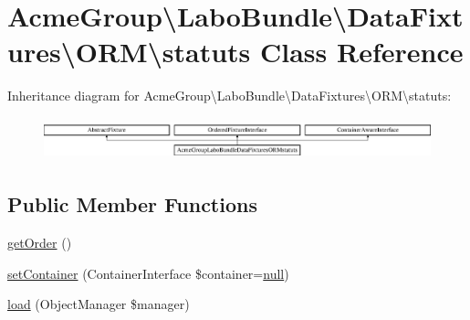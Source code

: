 \hypertarget{class_acme_group_1_1_labo_bundle_1_1_data_fixtures_1_1_o_r_m_1_1statuts}{\section{Acme\+Group\textbackslash{}Labo\+Bundle\textbackslash{}Data\+Fixtures\textbackslash{}O\+R\+M\textbackslash{}statuts Class Reference}
\label{class_acme_group_1_1_labo_bundle_1_1_data_fixtures_1_1_o_r_m_1_1statuts}
}
Inheritance diagram for Acme\+Group\textbackslash{}Labo\+Bundle\textbackslash{}Data\+Fixtures\textbackslash{}O\+R\+M\textbackslash{}statuts\+:\begin{figure}[H]
\begin{center}
\leavevmode
\includegraphics[height=1.224044cm]{class_acme_group_1_1_labo_bundle_1_1_data_fixtures_1_1_o_r_m_1_1statuts}
\end{center}
\end{figure}
\subsection*{Public Member Functions}
\begin{DoxyCompactItemize}
\item 
\hyperlink{class_acme_group_1_1_labo_bundle_1_1_data_fixtures_1_1_o_r_m_1_1statuts_adc2af7ca4305be43a9ccaa0b71d59313}{get\+Order} ()
\item 
\hyperlink{class_acme_group_1_1_labo_bundle_1_1_data_fixtures_1_1_o_r_m_1_1statuts_ad29c07de1b2964fc13d34be22b4e21e7}{set\+Container} (Container\+Interface \$container=\hyperlink{validate_8js_afb8e110345c45e74478894341ab6b28e}{null})
\item 
\hyperlink{class_acme_group_1_1_labo_bundle_1_1_data_fixtures_1_1_o_r_m_1_1statuts_a1e3d54d20923d1c0f0a5b38a6c5b4b56}{load} (Object\+Manager \$manager)
\end{DoxyCompactItemize}



